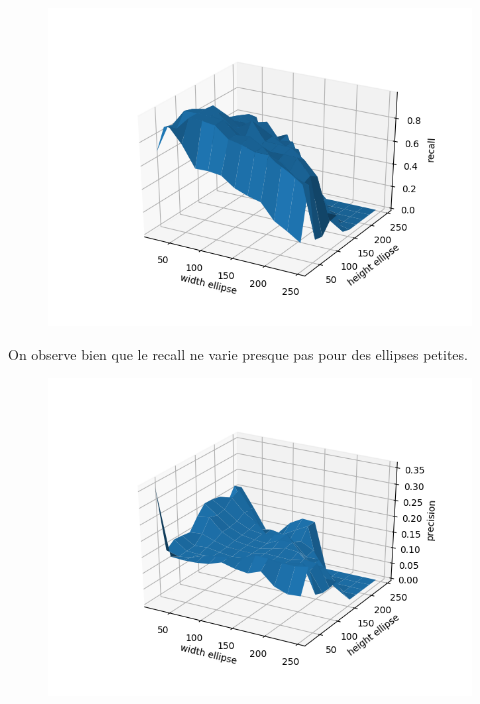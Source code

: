 \documentclass[a4paper,12pt, openany]{book}
\theoremstyle{break}
\begin{document}
\begin{figure}[H]
  \includegraphics[width=\textwidth]{images/recall_ellipse}\hfill
  \label{fig:rec_ellipse}
\end{figure}

On observe bien que le recall ne varie presque pas pour des ellipses petites.

\begin{figure}[H]
  \includegraphics[width=\textwidth]{images/precision_ellipse}\hfill
  \label{fig:prec_ellipse}
\end{figure}
\end{document}
